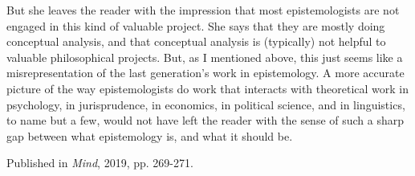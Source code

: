 \documentclass[
  10pt,
  letterpaper,
  DIV=11,
  numbers=noendperiod,
  twoside]{scrartcl}
\begin{document}
But she leaves the reader with the impression that most epistemologists
are not engaged in this kind of valuable project. She says that they are
mostly doing conceptual analysis, and that conceptual analysis is
(typically) not helpful to valuable philosophical projects. But, as I
mentioned above, this just seems like a misrepresentation of the last
generation's work in epistemology. A more accurate picture of the way
epistemologists do work that interacts with theoretical work in
psychology, in jurisprudence, in economics, in political science, and in
linguistics, to name but a few, would not have left the reader with the
sense of such a sharp gap between what epistemology is, and what it
should be.



\noindent Published in\emph{
Mind}, 2019, pp. 269-271.
\end{document}
